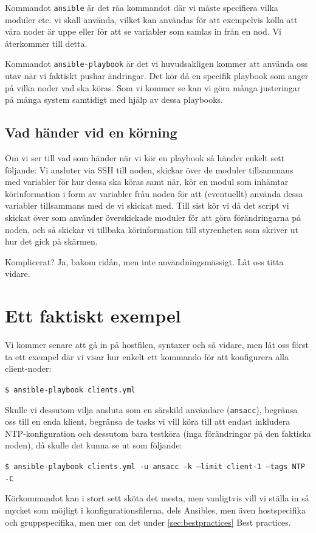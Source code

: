 Kommandot \texttt{ansible} är det råa kommandot där vi måste specifiera vilka moduler etc. vi skall använda, vilket kan användas för att exempelvis kolla att våra noder är uppe eller för att se variabler som samlas in från en nod. Vi återkommer till detta.

Kommandot \texttt{ansible-playbook} är det vi huvudsakligen kommer att använda oss utav när vi faktiskt pushar ändringar. Det kör då en specifik playbook som anger på vilka noder vad ska köras. Som vi kommer se kan vi göra många justeringar på många system samtidigt med hjälp av dessa playbooks.

\subsection{Vad händer vid en körning}
Om vi ser till vad som händer när vi kör en playbook så händer enkelt sett följande:
Vi ansluter via SSH till noden, skickar över de moduler tillsammans med variabler för hur dessa ska köras samt när, kör en modul som inhämtar körinformation i form av variabler från noden för att (eventuellt) använda dessa variabler tillsammans med de vi skickat med. Till sist kör vi då det script vi skickat över som använder överskickade moduler för att göra förändringarna på noden, och så skickar vi tillbaka körinformation till styrenheten som skriver ut hur det gick på skärmen.

Komplicerat? Ja, bakom ridån, men inte användningsmässigt. Låt oss titta vidare.

\section{Ett faktiskt exempel}
Vi kommer senare att gå in på hostfilen, syntaxer och så vidare, men låt oss först ta ett exempel där vi visar hur enkelt ett kommando för att konfigurera alla client-noder:

\texttt{\$ ansible-playbook clients.yml}

Skulle vi dessutom vilja ansluta som en särskild användare (\texttt{ansacc}), begränsa oss till en enda klient, begränsa de tasks vi 
vill köra till att endast inkludera NTP-konfiguration och dessutom bara testköra (inga förändringar på den faktiska 
noden), då skulle det kunna se ut som följande:

\texttt{\$ ansible-playbook clients.yml -u ansacc -k --limit client-1 --tags NTP -C}

Körkommandot kan i stort sett sköta det mesta, men vanligtvis vill vi ställa in så mycket som möjligt i konfigurationsfilerna, dels Ansibles, men även hostspecifika och gruppspecifika, men mer om det under \ref{sec:bestpractices} Best practices.
